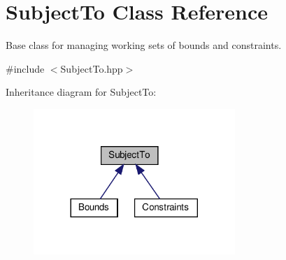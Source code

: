 \hypertarget{class_subject_to}{}\section{Subject\+To Class Reference}
\label{class_subject_to}


Base class for managing working sets of bounds and constraints.  




{\ttfamily \#include $<$Subject\+To.\+hpp$>$}



Inheritance diagram for Subject\+To\+:
\nopagebreak
\begin{figure}[H]
\begin{center}
\leavevmode
\includegraphics[width=216pt]{class_subject_to__inherit__graph}
\end{center}
\end{figure}
